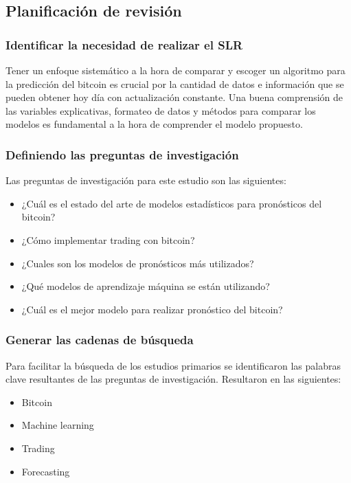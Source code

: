 \subsection{Planificación de revisión}
\subsubsection{Identificar la necesidad de realizar el SLR}
Tener un enfoque sistemático a la hora de comparar y escoger un algoritmo para la predicción del bitcoin es crucial por la cantidad de datos e información que se pueden obtener hoy día con actualización constante. Una buena comprensión de las variables explicativas, formateo de datos y métodos para comparar los modelos es fundamental a la hora de comprender el modelo propuesto.

\subsubsection{Definiendo las preguntas de investigación}
Las preguntas de investigación para este estudio son las siguientes:

\begin{itemize}
	\item ¿Cuál es el estado del arte de modelos estadísticos para pronósticos del bitcoin?
	\item ¿Cómo implementar trading con bitcoin?
	\item ¿Cuales son los modelos de pronósticos más utilizados?
	\item ¿Qué modelos de aprendizaje máquina se están utilizando?
	\item ¿Cuál es el mejor modelo para realizar pronóstico del bitcoin?
\end{itemize}

\subsubsection{Generar las cadenas de búsqueda}
Para facilitar la búsqueda de los estudios primarios se identificaron las palabras clave resultantes de las preguntas de investigación. Resultaron en las siguientes:

\begin{itemize}
	\item Bitcoin
	\item Machine learning
	\item Trading
	\item Forecasting
\end{itemize}

